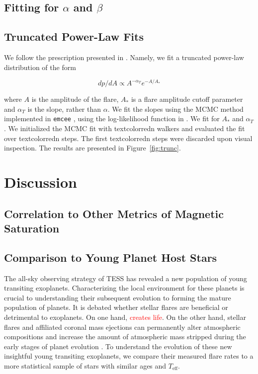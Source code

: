 \documentclass[twocolumn]{aastex631}
\begin{document}
\subsection{Fitting for $\alpha$ and $\beta$}


\subsection{Truncated Power-Law Fits}

We follow the prescription presented in \cite{seligman22}. Namely, we fit a truncated
power-law distribution of the form

\begin{equation}
  dp/dA \propto A^{-\alpha_T} e^{-A/A_*}
\end{equation}

where $A$ is the amplitude of the flare, $A_*$ is a flare amplitude cutoff parameter
and $\alpha_T$ is the slope, rather than
$\alpha$. We fit the slopes using the MCMC method implemented in \texttt{emcee}
\citep{goodman10, emcee}, using the log-likelihood function in \cite{seligman22}.
We fit for $A_*$ and $\alpha_T$. We initialized the MCMC fit with textcolor{red}{n}
walkers and evaluated the fit over textcolor{red}{n} steps. The first textcolor{red}{n}
steps were discarded upon visual inspection. The results are presented in Figure~\ref{fig:trunc}.

\section{Discussion}\label{sec:discuss}

\subsection{Correlation to Other Metrics of Magnetic Saturation}


\subsection{Comparison to Young Planet Host Stars}

The all-sky observing strategy of TESS has revealed a new population of young transiting exoplanets.
Characterizing the local environment for these planets is crucial to understanding their subsequent evolution
to forming the mature population of planets. It is debated whether stellar flares are beneficial or detrimental
to exoplanets. On one hand, \textcolor{red}{creates life}. On the other hand, stellar flares and affiliated
coronal mass ejections can permanently alter atmospheric compositions \citep{chen21} and increase the amount of
atmospheric mass stripped during the early stages of planet evolution \citep{feinstein20}. To understand the
evolution of these new insightful young transiting exoplanets, we compare their measured flare rates to a more
statistical sample of stars with similar ages and $T_\textrm{eff}$.
\end{document}
